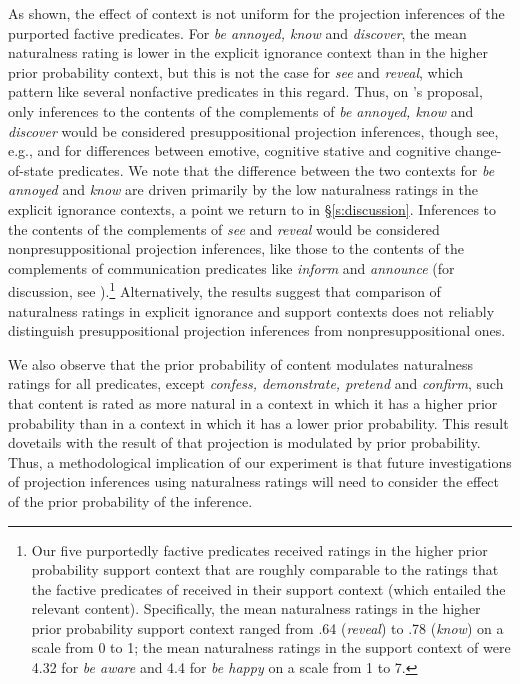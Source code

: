 \documentclass[11pt,fleqn]{article}
\newcommand{\6}{\mbox{$[\hspace*{-.6mm}[$}}
\newcommand{\9}{\mbox{$]\hspace*{-.6mm}]$}}
\newcommand{\citepos}[1]{\citeauthor{#1}'s \citeyear{#1}}
\begin{document}
As shown, the effect of context is not uniform for the projection inferences of the purported factive predicates. For {\em be annoyed, know} and {\em discover}, the mean naturalness rating is lower in the explicit ignorance context than in the higher prior probability context, but this is not the case for {\em see} and {\em reveal}, which pattern like several nonfactive predicates in this regard. Thus, on \citepos{mandelkern-etal2020} proposal, only inferences to the contents of the complements of \emph{be annoyed, know} and \emph{discover} would be considered presuppositional projection inferences, though see, e.g., \citealt{karttunen2016} and \citealt{djaerv-thesis} for differences between emotive, cognitive stative and cognitive change-of-state predicates. We note that the difference between the two contexts for \emph{be annoyed} and \emph{know} are driven primarily by the low naturalness ratings in the explicit ignorance contexts, a point we return to in \S\ref{s:discussion}. Inferences to the contents of the complements of \emph{see} and \emph{reveal} would be considered nonpresuppositional projection inferences, like those to the contents of the complements of communication predicates like \emph{inform} and \emph{announce} (for discussion, see \citealt{anand-hacquard2014}).\footnote{Our five purportedly factive predicates received ratings in the higher prior probability support context that are roughly comparable to the ratings that the factive predicates of \citealt{mandelkern-etal2020} received in their support context (which entailed the relevant content). Specifically, the mean naturalness ratings in the higher prior probability support context ranged from .64 ({\em reveal}) to .78 ({\em know}) on a scale from 0 to 1; the mean naturalness ratings in the support context of \citealt{mandelkern-etal2020} were 4.32  for {\em be aware} and 4.4 for {\em be happy} on a scale from 1 to 7.} Alternatively, the results suggest that comparison of naturalness ratings in explicit ignorance and support contexts does not reliably distinguish presuppositional projection inferences from nonpresuppositional ones. 


We also observe that the prior probability of content modulates naturalness ratings for all predicates, except {\em confess, demonstrate, pretend} and {\em confirm}, such that content is rated as more natural in a context in which it has a higher prior probability than in a context in which it has a lower prior probability. This result dovetails with the result of \citealt{degen-tonhauser-openmind} that projection is modulated by prior probability. Thus, a methodological implication of our experiment is that future investigations of projection inferences using naturalness ratings will need to consider the effect of the prior probability of the inference.
\end{document}
